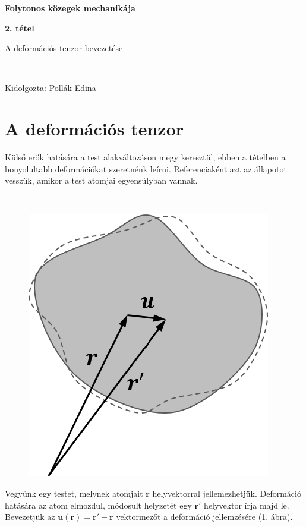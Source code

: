 \documentclass[a4paper, 12pt]{article}
\begin{document}
\begin{titlepage}\centering
\vspace*{250 pt}
\Huge \textbf{Folytonos közegek mechanikája}

\LARGE \textbf{2. tétel}

\LARGE A deformációs tenzor bevezetése


~

\LARGE Kidolgozta: Pollák Edina

\vspace*{\fill}
\end{titlepage}

\newpage
\part*{\Large{A deformációs tenzor}}

\vspace{30 pt}

Külső erők hatására a test alakváltozáson megy keresztül, ebben a tételben a bonyolultabb deformációkat szeretnénk leírni. Referenciaként azt az állapotot vesszük, amikor a test atomjai egyensúlyban vannak.

~

\begin{figure}[h]
\centering
\includegraphics[scale=0.4]{tetel2_1.png}
\caption{}
\end{figure}

Vegyünk egy testet, melynek atomjait $\mathbf{r}$ helyvektorral jellemezhetjük. Deformáció hatására az atom elmozdul, módosult helyzetét egy $\mathbf{r'}$ helyvektor írja majd le. Bevezetjük az $\mathbf{u(r)}=\mathbf{r'}-\mathbf{r}$ vektormezőt a deformáció jellemzésére (1. ábra).
\end{document}
